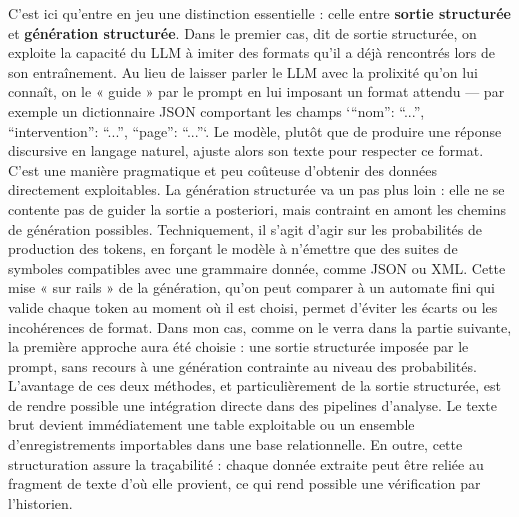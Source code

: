 C’est ici qu’entre en jeu une distinction essentielle : celle entre \textbf{sortie structurée} et \textbf{génération structurée}. Dans le premier cas, dit de sortie structurée, on exploite la capacité du LLM à imiter des formats qu’il a déjà rencontrés lors de son entraînement. Au lieu de laisser parler le LLM avec la prolixité qu'on lui connaît, on le « guide » par le prompt en lui imposant un format attendu — par exemple un dictionnaire JSON comportant les champs `{\enquote{nom}: \enquote{...}, \enquote{intervention}: \enquote{...}, \enquote{page}: \enquote{...}}`. Le modèle, plutôt que de produire une réponse discursive en langage naturel, ajuste alors son texte pour respecter ce format. C’est une manière pragmatique et peu coûteuse d’obtenir des données directement exploitables. La génération structurée va un pas plus loin : elle ne se contente pas de guider la sortie a posteriori, mais contraint en amont les chemins de génération possibles. Techniquement, il s’agit d’agir sur les probabilités de production des tokens, en forçant le modèle à n’émettre que des suites de symboles compatibles avec une grammaire donnée, comme JSON ou XML. Cette mise « sur rails » de la génération, qu’on peut comparer à un automate fini qui valide chaque token au moment où il est choisi, permet d’éviter les écarts ou les incohérences de format. Dans mon cas, comme on le verra dans la partie suivante, la première approche aura été choisie : une sortie structurée imposée par le prompt, sans recours à une génération contrainte au niveau des probabilités. L’avantage de ces deux méthodes, et particulièrement de la sortie structurée, est de rendre possible une intégration directe dans des pipelines d’analyse. Le texte brut devient immédiatement une table exploitable ou un ensemble d’enregistrements importables dans une base relationnelle. En outre, cette structuration assure la traçabilité : chaque donnée extraite peut être reliée au fragment de texte d’où elle provient, ce qui rend possible une vérification par l’historien.

